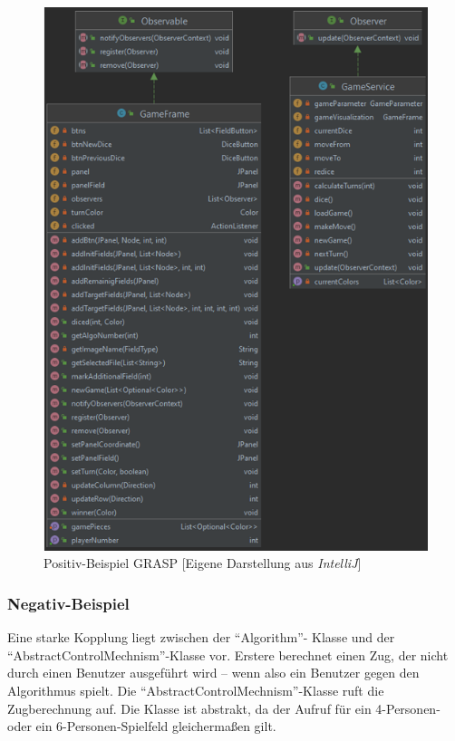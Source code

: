 \begin{figure}[htbp]
\centering
\centerline{\includegraphics[scale=1]{grasp1}}
\caption{Positiv-Beispiel GRASP [Eigene Darstellung aus \emph{IntelliJ}]}
\label{fig:grasp1}
\end{figure}

\newpage
\subsubsection{Negativ-Beispiel}
\noindent Eine starke Kopplung liegt zwischen der \enquote{Algorithm}- Klasse und der \enquote{AbstractControl\-Mechnism}-Klasse vor. Erstere berechnet einen Zug, der nicht durch einen Benutzer ausgeführt wird -- wenn also ein Benutzer gegen den Algorithmus spielt. Die \enquote{AbstractControl\-Mechnism}-Klasse ruft die Zugberechnung auf. Die Klasse ist abstrakt, da der Aufruf für ein 4-Personen- oder ein 6-Personen-Spielfeld gleichermaßen gilt. 

